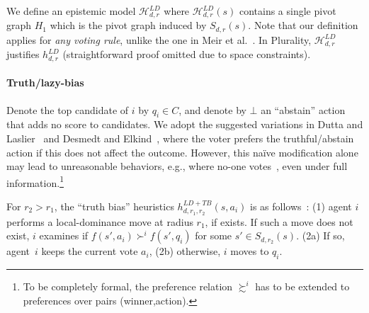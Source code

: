 \documentclass[letterpaper]{article} %
\def\calH{\mathcal{H}}
\begin{document}
We define an epistemic model $\calH^{LD}_{d,r}$ where $\calH^{LD}_{d,r}(s)$ contains a single pivot graph $H_1$ which is the pivot graph induced by $S_{d,r}(s)$. Note that our definition applies for \emph{any voting rule}, unlike the one in Meir et al.~. In Plurality, $\calH^{LD}_{d,r}$ justifies $h^{LD}_{d,r}$ (straightforward proof omitted due to space constraints).



\paragraph{Truth/lazy-bias} 
Denote the top candidate of $i$ by $q_i\in C$, and denote by $\bot$ an ``abstain'' action that adds no score to candidates.
We adopt the suggested variations in Dutta and Laslier~ and Desmedt and Elkind~, where the voter prefers the truthful/abstain action if this does not affect the outcome. However, this na\"ive modification alone may lead to unreasonable behaviors, e.g., where no-one votes~\cite{elkind2015equilibria}, even under full information.\footnote{To be completely formal, the preference relation $\succsim^i$ has to be extended to preferences over pairs (winner,action).} 
 
For $r_2>r_1$, the ``truth bias'' heuristics $h^{LD+TB}_{d,r_1,r_2}(s,a_i)$ is as follows~\cite{MLR14}: (1) agent $i$ performs a local-dominance move at radius $r_{1}$, if exists. If such a move does not exist, $i$ examines if $f(s',a_i) \succ^i f(s',q_i)$ for some $s'\in S_{d,r_2}(s)$. (2a) If so, agent~$i$ keeps the current vote $a_i$, (2b) otherwise, $i$ moves to $q_i$.
\end{document}
